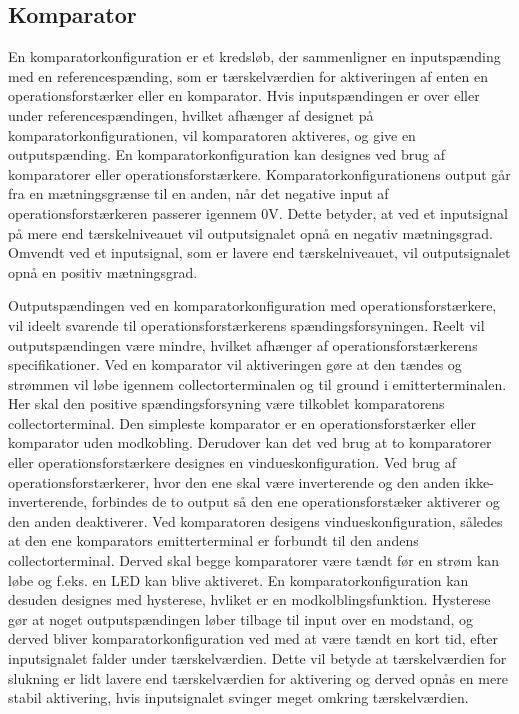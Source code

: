 \subsection{Komparator}\label{Komparatorafsnit}
En komparatorkonfiguration er et kredsløb, der sammenligner en inputspænding  med en referencespænding, som er tærskelværdien for aktiveringen af enten en operationsforstærker eller en komparator. %
Hvis inputspændingen er over eller under referencespændingen, hvilket afhænger af designet på komparatorkonfigurationen, vil komparatoren aktiveres, og give en outputspænding. En komparatorkonfiguration kan designes ved brug af komparatorer eller operationsforstærkere.
Komparatorkonfigurationens output går fra en mætningsgrænse til en anden, når det negative input af operationsforstærkeren passerer igennem $0$V. Dette betyder, at ved et inputsignal på mere end tærskelniveauet vil outputsignalet opnå en negativ mætningsgrad. Omvendt ved et inputsignal, som er lavere end tærskelniveauet, vil outputsignalet opnå en positiv mætningsgrad. \cite{webster2009} 

Outputspændingen ved en komparatorkonfiguration med operationsforstærkere, vil ideelt svarende til operationsforstærkerens spændingsforsyningen. Reelt vil outputspændingen være mindre, hvilket afhænger af operationsforstærkerens specifikationer. Ved en komparator vil aktiveringen gøre at den tændes og strømmen vil løbe igennem collectorterminalen og til ground i emitterterminalen. Her skal den positive spændingsforsyning være tilkoblet komparatorens collectorterminal. Den simpleste komparator er en operationsforstærker eller komparator uden modkobling. Derudover kan det ved brug at to komparatorer eller operationsforstærkere designes en vindueskonfiguration. Ved brug af operationsforstærkerer, hvor den ene skal være inverterende og den anden ikke-inverterende,  forbindes de to output så den ene operationsforstæker aktiverer og den anden deaktiverer. Ved komparatoren desigens vindueskonfiguration, således at den ene komparators emitterterminal er forbundt til den andens collectorterminal. Derved skal begge komparatorer være tændt før en strøm kan løbe og f.eks. en LED kan blive aktiveret. En komparatorkonfiguration kan desuden designes med hysterese, hvliket er en modkolblingsfunktion. Hysterese gør at noget outputspændingen løber tilbage til input over en modstand, og derved bliver komparatorkonfiguration ved med at være tændt en kort tid, efter inputsignalet falder under tærskelværdien. Dette vil betyde at tærskelværdien for slukning er lidt lavere end tærskelværdien for aktivering og derved opnås en mere stabil aktivering, hvis inputsignalet svinger meget omkring tærskelværdien. \cite{webster2009, Storr2015} \\
  


